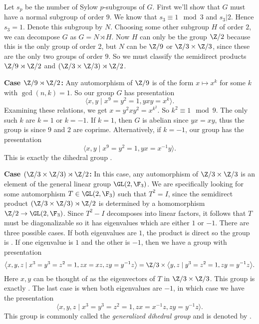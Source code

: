 \documentclass[11pt,letterpaper]{article}
\begin{document}
Let $s_p$ be the number of Sylow $p$-subgroups of $G$. First we'll show that $G$ must have a normal subgroup of order $9$. We know that $s_3\equiv 1\mod 3$ and $s_3|2$. Hence $s_3=1$. Denote this subgroup by $N$. Choosing some other subgroup $H$ of order $2$, we can decompose $G$ as $G=N\rtimes H$. Now $H$ can only be the group $\Z/2$ because this is the only group of order 2, but $N$ can be $\Z/9$ or $\Z/3\times\Z/3$, since these are the only two groups of order $9$. So we must classify the semidirect products $\Z/9\rtimes \Z/2$ and $(\Z/3\times \Z/3)\rtimes \Z/2$.

\textbf{Case $\Z/9\rtimes \Z/2$:} Any automorphism of $\Z/9$ is of the form $x\mapsto x^k$ for some $k$ with $\gcd(n,k)=1$. So our group $G$ has presentation 
\[
    \big\langle x,y \mid x^9=y^2=1, yxy=x^k \big\rangle
.\] 
Examining these relations, we get $x=y^2xy^2=x^{k^2}$. So $k^2\equiv 1\mod 9$. The only such $k$ are $k=1$ or $k=-1$. If $k=1$, then $G$ is abelian since $yx=xy$, thus the group is  since $9$ and $2$ are coprime. Alternatively, if $k=-1$, our group has the presentation
\[
    \big\langle x,y \mid x^9=y^2=1, yx=x^{-1}y \big\rangle
.\] 
This is exactly the dihedral group .

\textbf{Case $(\Z/3\times \Z/3)\rtimes \Z/2$:} In this case, any automorphism of $\Z/3\times \Z/3$ is an element of the general linear group $\GL(2, \F_3)$. We are specifically looking for some automorphism $T\in \GL(2,\F_3)$ such that $T^2=I$, since the semidirect product $(\Z/3\times \Z/3)\rtimes \Z/2$ is determined by a homomorphism $\Z/2\to\GL(2,\F_3)$. Since $T^2-I$ decomposes into linear factors, it follows that $T$ must be diagonalizable so it has eigenvalues which are either $1$ or $-1$. There are three possible cases. If both eigenvalues are $1$, the product is direct so the group is . If one eigenvalue is $1$ and the other is $-1$, then we have a group with presentation
\[
    \big\langle x,y,z \mid x^3=y^3=z^2=1, zx=xz, zy=y^{-1}z \big\rangle = \Z/3 \times \big\langle y,z \mid y^3=z^2=1, zy=y^{-1}z\big\rangle
.\] 
Here $x,y$ can be thought of as the eigenvectors of $T$ in $\Z/3\times \Z/3$. This group is exactly . The last case is when both eigenvalues are $-1$, in which case we have the presentation
\[  
    \big\langle x,y,z \mid x^3=y^3=z^2=1, zx=x^{-1}z, zy=y^{-1}z \big\rangle
.\]     
This group is commonly called the {\em generalized dihedral group} and is denoted by .
\end{document}
